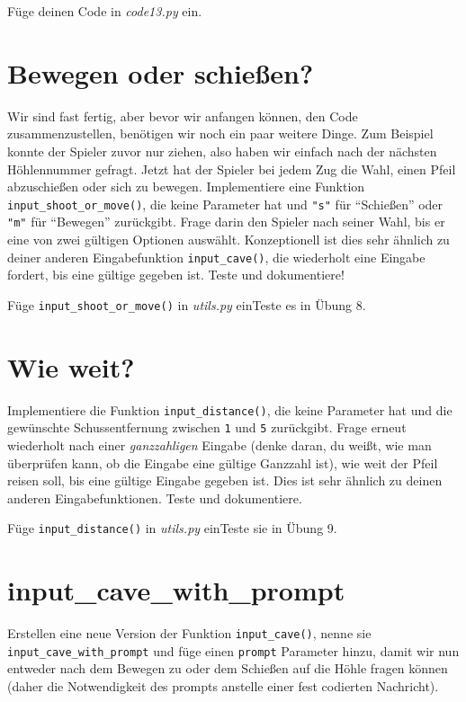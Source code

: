 \documentclass[
]{book}
\begin{document}
Füge deinen Code in \emph{code13.py} ein.

\hypertarget{bewegen-oder-schieuxdfen}{%
\section{Bewegen oder schießen?}\label{bewegen-oder-schieuxdfen}}

Wir sind fast fertig, aber bevor wir anfangen können, den Code zusammenzustellen, benötigen wir noch ein paar weitere Dinge. Zum Beispiel konnte der Spieler zuvor nur ziehen, also haben wir einfach nach der nächsten Höhlennummer gefragt. Jetzt hat der Spieler bei jedem Zug die Wahl, einen Pfeil abzuschießen oder sich zu bewegen. Implementiere eine Funktion \texttt{input\_shoot\_or\_move()}, die keine Parameter hat und \texttt{"s"} für ``Schießen'' oder \texttt{"m"} für ``Bewegen'' zurückgibt. Frage darin den Spieler nach seiner Wahl, bis er eine von zwei gültigen Optionen auswählt. Konzeptionell ist dies sehr ähnlich zu deiner anderen Eingabefunktion \texttt{input\_cave()}, die wiederholt eine Eingabe fordert, bis eine gültige gegeben ist. Teste und dokumentiere!

Füge \texttt{input\_shoot\_or\_move()} in \emph{utils.py} einTeste es in Übung 8.

\hypertarget{wie-weit}{%
\section{Wie weit?}\label{wie-weit}}

Implementiere die Funktion \texttt{input\_distance()}, die keine Parameter hat und die gewünschte Schussentfernung zwischen \texttt{1} und \texttt{5} zurückgibt. Frage erneut wiederholt nach einer \emph{ganzzahligen} Eingabe (denke daran, du weißt, wie man überprüfen kann, ob die Eingabe eine gültige Ganzzahl ist), wie weit der Pfeil reisen soll, bis eine gültige Eingabe gegeben ist. Dies ist sehr ähnlich zu deinen anderen Eingabefunktionen. Teste und dokumentiere.

Füge \texttt{input\_distance()} in \emph{utils.py} einTeste sie in Übung 9.

\hypertarget{input_cave_with_prompt}{%
\section{input\_cave\_with\_prompt}\label{input_cave_with_prompt}}

Erstellen eine neue Version der Funktion \texttt{input\_cave()}, nenne sie \texttt{input\_cave\_with\_prompt} und füge einen \texttt{prompt} Parameter hinzu, damit wir nun entweder nach dem Bewegen zu oder dem Schießen auf die Höhle fragen können (daher die Notwendigkeit des prompts anstelle einer fest codierten Nachricht).
\end{document}
